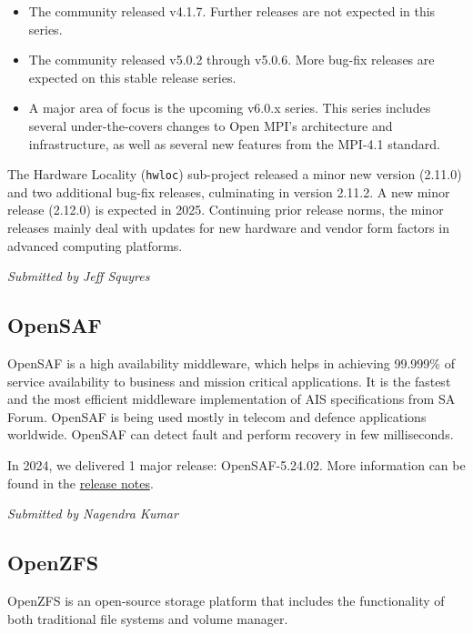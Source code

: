 \documentclass[a4paper]{report}
\begin{document}
\begin{itemize}

\item The community released v4.1.7. Further releases are not expected in this series.

\item The community released v5.0.2 through v5.0.6.  More bug-fix releases are expected on this stable release series.

\item A major area of focus is the upcoming v6.0.x series. This series includes several under-the-covers changes to Open MPI’s architecture and infrastructure, as well as several new features from the MPI-4.1 standard.

\end{itemize}

The Hardware Locality ({\tt hwloc}) sub-project released a minor new version (2.11.0) and two additional bug-fix releases, culminating in version 2.11.2.  A new minor release (2.12.0) is expected in 2025.  Continuing prior release norms, the minor releases mainly deal with updates for new hardware and vendor form factors in advanced computing platforms.

{\em Submitted by Jeff Squyres}

\subsection{OpenSAF}

OpenSAF is a high availability middleware, which helps in achieving 99.999\% of service availability to business and mission critical applications. It is the fastest and the most efficient middleware implementation of AIS specifications from SA Forum. OpenSAF is being used mostly in telecom and defence applications worldwide. OpenSAF can detect fault and perform recovery in few milliseconds.

In 2024, we delivered 1 major release: OpenSAF-5.24.02.  More information can be found in the \href{https://sourceforge.net/p/opensaf/wiki/NEWS-5.24.02/}{release notes}.

{\em Submitted by Nagendra Kumar}

\subsection{OpenZFS}

OpenZFS is an open-source storage platform that includes the functionality of both traditional file systems and volume manager.
\end{document}
